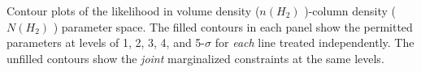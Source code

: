 Contour plots of the likelihood in volume density ($n(H_2)$ \percc)-column
density ($N(H_2)$ \persc) parameter space.  The filled contours in each panel
show the permitted parameters at levels of 1, 2, 3, 4, and 5-$\sigma$ for
\emph{each} line treated independently.  The unfilled contours show the
\emph{joint} marginalized constraints at the same levels.
